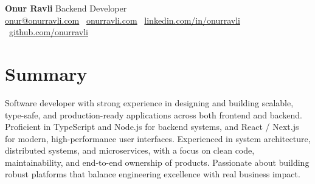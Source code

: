 \documentclass[10pt,a4paper]{extarticle}
\begin{document}
\begin{center}
    \begin{minipage}{\textwidth}
        \centering
        {\LARGE\textbf{Onur Ravli}} \hspace{2pt} {\LARGE{Backend Developer}}\\[10pt]
        \href{mailto:onur@onurravli.com}{onur@onurravli.com} \textbullet\
        \href{https://onurravli.com}{onurravli.com} \textbullet\
        \href{https://linkedin.com/in/onurravli}{linkedin.com/in/onurravli} \textbullet\
        \href{https://github.com/onurravli}{github.com/onurravli}
    \end{minipage}
\end{center}
\section{Summary}
Software developer with strong experience in designing and building scalable, type-safe, and production-ready applications across both frontend and backend. Proficient in TypeScript and Node.js for backend systems, and React / Next.js for modern, high-performance user interfaces. Experienced in system architecture, distributed systems, and microservices, with a focus on clean code, maintainability, and end-to-end ownership of products. Passionate about building robust platforms that balance engineering excellence with real business impact.
\end{document}
